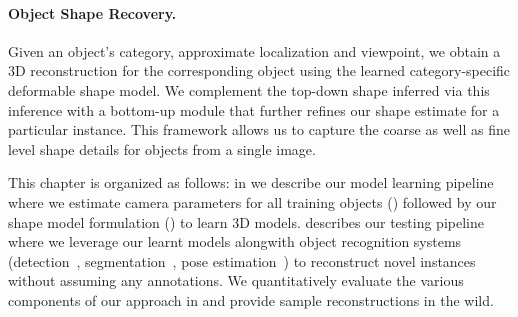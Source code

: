 
\paragraph{Object Shape Recovery.}
Given an object's category, approximate localization and viewpoint, we obtain a 3D reconstruction for the corresponding object using the learned category-specific deformable shape model. We complement the top-down shape inferred via this inference with a bottom-up module that further refines our shape estimate for a particular instance. This framework allows us to capture the coarse as well as fine level shape details for objects from a single image.

This chapter is organized as follows: in  we describe our model learning pipeline where we estimate camera parameters for all training objects () followed by our shape model formulation () to learn 3D models.  describes our testing pipeline where we leverage our learnt models alongwith object recognition systems (detection~\cite{girshick2013rich}, segmentation~\cite{BharathCVPR2015}, pose estimation~\cite{ShubhamPose}) to reconstruct novel instances without assuming any annotations. We quantitatively evaluate the various components of our approach in  and provide sample reconstructions in the wild.

